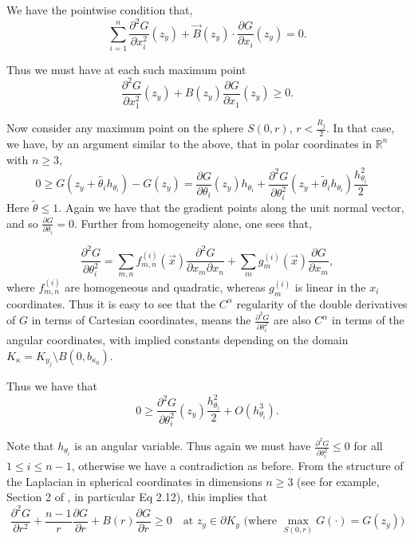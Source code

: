 \documentclass{article}
\theoremstyle{plain}
\theoremstyle{definition}
\theoremstyle{plain}
\begin{document}
We have the pointwise condition that, $$\sum_{i=1}^{n} \frac{\partial^2 G}{\partial x_i^2}(z_y) + \vec{B}(z_y) \cdot \frac{\partial G}{\partial x_i}(z_y) = 0.$$

Thus we must have at each such maximum point
\[
\frac{\partial^2 G}{\partial x_1^2}(z_y) + B(z_y) \frac{\partial G}{\partial x_1}(z_y) \ge 0.
\]

Now consider any maximum point on the sphere $S(0, r)$, $r < \frac{R_j}{2}$. In that case, we have, by an argument similar to the above, that in polar coordinates in $\mathbb{R}^n$ with $n \ge 3$,
\begin{equation}
0 \ge G(z_y + \hat{\theta}_i h_{\theta_i}) - G(z_y) = \frac{\partial G}{\partial \theta_i}(z_y)h_{\theta_i} + \frac{\partial^2 G}{\partial \theta_i^2}(z_y + \tilde{\theta}_i h_{\theta_i}) \frac{h_{\theta_i}^2}{2} \quad 
\end{equation}
Here $\tilde{\theta} \le 1$. Again we have that the gradient points along the unit normal vector, and so $\frac{\partial G}{\partial \theta_i} = 0$. Further from homogeneity alone, one sees that,


\begin{equation}\frac{\partial^2 G}{\partial \theta_i^2} = \sum_{m,n} f_{m,n}^{(i)}(\vec{x}) \frac{\partial^2 G}{\partial x_m \partial x_n} + \sum_{m} g_m^{(i)}(\vec{x}) \frac{\partial G}{\partial x_m},\end{equation} where $f_{m,n}^{(i)}$ are homogeneous and quadratic, whereas $g_m^{(i)}$ is linear in the $x_i$ coordinates. Thus it is easy to see that the $C^\alpha$ regularity of the double derivatives of $G$ in terms of Cartesian coordinates, means the $\frac{\partial^2 G}{\partial \theta_i^2}$ are also $C^\alpha$ in terms of the angular coordinates, with implied constants depending on the domain $K_\kappa = K_{y_j} \setminus B(0, b_{\kappa_0})$.

Thus we have that
$$0 \ge \frac{\partial^2 G}{\partial \theta_i^2}(z_y) \frac{h_{\theta_i}^2}{2} + O(h_{\theta_i}^3).$$

Note that $h_{\theta_i}$ is an angular variable. Thus again we must have $\frac{\partial^2 G}{\partial \theta_i^2} \le 0$ for all $1 \le i \le n-1$, otherwise we have a contradiction as before. From the structure of the Laplacian in spherical coordinates in dimensions $n \ge 3$ (see for example, Section 2 of \cite{Sm19}, in particular Eq 2.12), this implies that
$$\frac{\partial^2 G}{\partial r^2} + \frac{n-1}{r} \frac{\partial G}{\partial r} + B(r) \frac{\partial G}{\partial r} \ge 0 \quad \text{at } z_y \in \partial K_y \text{ (where } \max_{S(0,r)} G(\cdot) = G(z_y))$$
\end{document}

